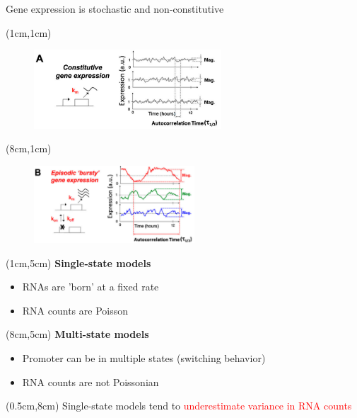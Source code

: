 \documentclass[aspectratio=1610]{beamer}					%
\begin{document}
\begin{frame}{Gene expression is stochastic and non-constitutive}


\begin{textblock*}{7cm}(1cm,1cm)
\begin{figure}
\includegraphics[width=7cm]{burst-1.png}
\end{figure}
\end{textblock*}

\begin{textblock*}{7cm}(8cm,1cm)
\begin{figure}
\includegraphics[width=6cm]{burst-2.png}
\end{figure}
\end{textblock*}


\begin{textblock*}{6cm}(1cm,5cm)
\hspace{0.5in}\textbf{Single-state models}
\begin{itemize}
\item RNAs are 'born' at a fixed rate
\item RNA counts are Poisson
\end{itemize}
\end{textblock*}

\begin{textblock*}{6cm}(8cm,5cm)
\hspace{0.5in}\textbf{Multi-state models}
\begin{itemize}
\item Promoter can be in multiple states (switching behavior)
\item RNA counts are not Poissonian
\end{itemize}

\end{textblock*}

\begin{textblock*}{15cm}(0.5cm,8cm)
Single-state models tend to \textcolor{red}{underestimate variance in RNA counts}
\end{textblock*}


\end{frame}
\end{document}

